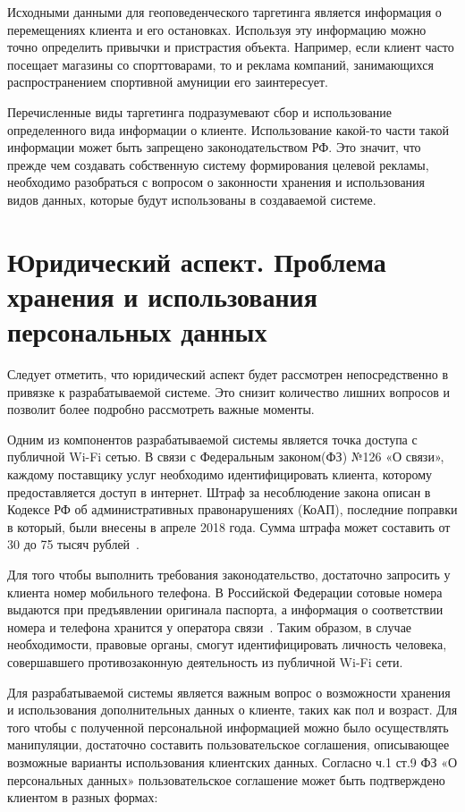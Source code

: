 Исходными данными для геоповеденческого таргетинга является информация о перемещениях клиента и его остановках. Используя эту информацию можно точно определить привычки и пристрастия объекта. Например, если клиент часто посещает магазины со спорттоварами, то и реклама компаний, занимающихся распространением спортивной амуниции его заинтересует.

Перечисленные виды таргетинга подразумевают сбор и использование определенного вида информации о клиенте. Использование какой-то части такой информации может быть запрещено законодательством РФ. Это значит, что прежде чем создавать собственную систему формирования целевой рекламы, необходимо разобраться с вопросом о законности хранения и использования видов данных, которые будут использованы в создаваемой системе.
        
\section{Юридический аспект. Проблема хранения и использования персональных данных}

Следует отметить, что юридический аспект будет рассмотрен непосредственно в привязке к разрабатываемой системе. Это снизит количество лишних вопросов и позволит более подробно рассмотреть важные моменты.

Одним из компонентов разрабатываемой системы является точка доступа с публичной Wi-Fi сетью. В связи с Федеральным законом(ФЗ) №126 «О связи», каждому поставщику услуг необходимо идентифицировать клиента, которому предоставляется доступ в интернет. Штраф за несоблюдение закона описан в Кодексе РФ об административных правонарушениях (КоАП), последние поправки в который, были внесены в апреле 2018 года. Сумма штрафа может составить от 30 до 75 тысяч рублей~\cite{5myth}.

Для того чтобы выполнить требования законодательство, достаточно запросить у клиента номер мобильного телефона. В Российской Федерации сотовые номера выдаются при предъявлении оригинала паспорта, а информация о соответствии номера и телефона хранится у оператора связи~\cite{fz}. Таким образом, в случае необходимости, правовые органы, смогут идентифицировать личность человека, совершавшего противозаконную деятельность из публичной Wi-Fi сети.

Для разрабатываемой системы является важным вопрос о возможности хранения и использования дополнительных данных о клиенте, таких как пол и возраст. Для того чтобы с полученной персональной информацией можно было осуществлять манипуляции, достаточно составить пользовательское соглашения, описывающее возможные варианты использования клиентских данных. Согласно ч.1 ст.9 ФЗ «О персональных данных» пользовательское соглашение может быть подтверждено клиентом в разных формах:

